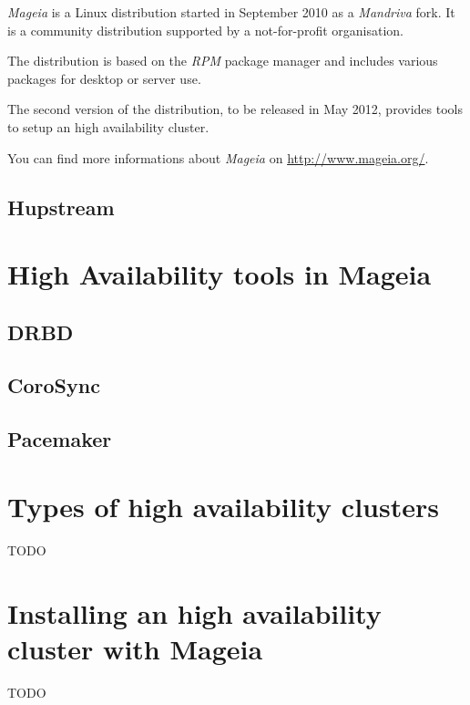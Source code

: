\documentclass[a4paper,12pt]{article}
\begin{document}
\emph{Mageia} is a Linux distribution started in September 2010 as a
\emph{Mandriva} fork. It is a community distribution supported by a
not-for-profit organisation.

The distribution is based on the \emph{RPM} package manager and includes
various packages for desktop or server use.

The second version of the distribution, to be released in May 2012,
provides tools to setup an high availability cluster.

You can find more informations about \emph{Mageia} on \url{http://www.mageia.org/}.

\cleardoublepage
\subsection{Hupstream}

\cleardoublepage
\section{High Availability tools in Mageia}
\subsection{DRBD}
\subsection{CoroSync}
\subsection{Pacemaker}

\cleardoublepage
\section{Types of high availability clusters}
TODO

\cleardoublepage
\section{Installing an high availability cluster with Mageia}
TODO

\cleardoublepage
\end{document}
